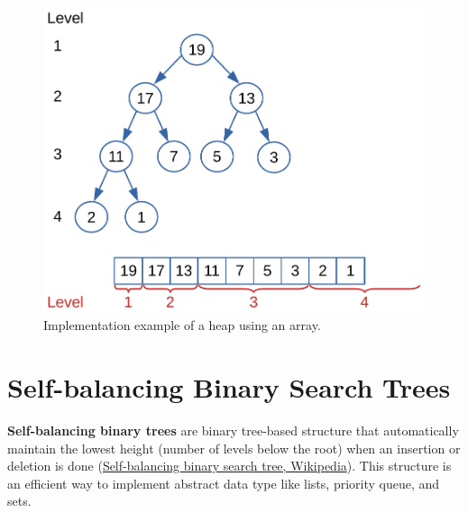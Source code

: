 \begin{figure}[H]
	\begin{center}
		\includegraphics[scale=.6]{chapters/trees/images/trees_18.pdf}
		\caption[Implementation example of a heap using an array.]{Implementation example of a heap using an array.}
		\label{trees_18}
	\end{center}
\end{figure}

\section{Self-balancing Binary Search Trees}
\textbf{Self-balancing binary trees} are binary tree-based structure that automatically maintain the lowest height (number of levels below the root) when an insertion or deletion is done \cite{wikiselfbalancing} (\href{https://en.wikipedia.org/wiki/Self-balancing_binary_search_tree}{Self-balancing binary search tree, Wikipedia}). This structure is an efficient way to implement abstract data type like lists, priority queue, and sets.


